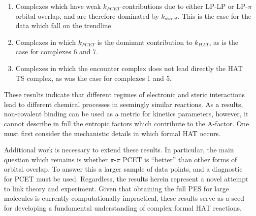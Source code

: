 \begin{enumerate}
  \item Complexes which have weak $k_{PCET}$ contributions due to either LP-LP
	  or LP-$\pi$ orbital overlap, and are therefore dominated by
	  $k_{direct}$. This is the case for the data which fall on the
	  trendline.

  \item Complexes in which $k_{PCET}$ is the dominant contribution to
	  $k_{HAT}$, as is the case for complexes 6 and 7.

  \item Complexes in which the encounter complex does not lead directly the
  HAT TS complex, as was the case for complexes 1 and 5.
\end{enumerate}

These results indicate that different regimes of electronic and steric
interactions lead to different chemical processes in seemingly similar
reactions. As a results, non-covalent binding can be used as a metric for
kinetics parameters, however, it cannot describe in full the entropic factors
which contribute to the A-factor. One must first consider the mechanistic
details in which formal HAT occurs.

Additional work is necessary to extend these results. In particular, the main
question which remains is whether $\pi$-$\pi$ PCET is ``better'' than other
forms of orbital overlap. To answer this a larger sample of data points, and a
diagnostic for PCET must be used. Regardless, the results herein represent a
novel attempt to link theory and experiment. Given that obtaining the full PES
for large molecules is currently computationally impractical, these results
serve as a seed for developing a fundamental understanding of complex formal HAT
reactions.
